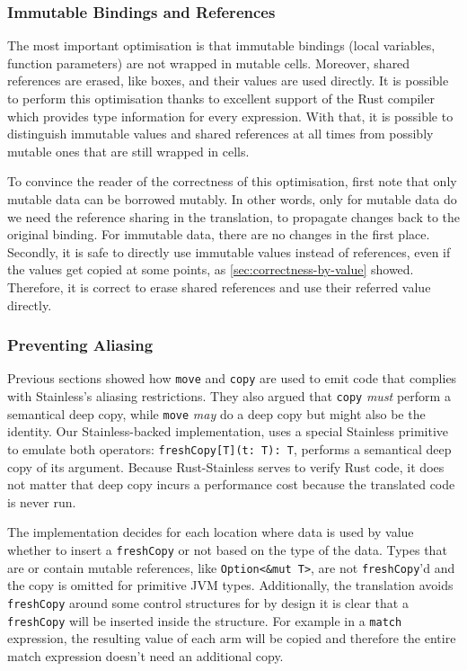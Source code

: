 \subsubsection{Immutable Bindings and References}

The most important optimisation is that immutable bindings (local variables,
function parameters) are not wrapped in mutable cells. Moreover, shared
references are erased, like boxes, and their values  are used directly. It is
possible to perform this optimisation thanks to excellent support of the Rust
compiler which provides type information for every expression. With that, it is
possible to distinguish immutable values and shared references at all times from
possibly mutable ones that are still wrapped in cells.

To convince the reader of the correctness of this optimisation, first note that
only mutable data can be borrowed mutably. In other words, only for mutable data
do we need the reference sharing in the translation, to propagate changes back
to the original binding. For immutable data, there are no changes in the first
place. Secondly, it is safe to directly use immutable values instead of
references, even if the values get copied at some points, as
\autoref{sec:correctness-by-value} showed. Therefore, it is correct to erase
shared references and use their referred value directly.

\subsubsection{Preventing Aliasing}

Previous sections showed how \lstinline!move! and \lstinline!copy! are used to
emit code that complies with Stainless's aliasing restrictions. They also argued
that \lstinline!copy! \emph{must} perform a semantical deep copy, while
\lstinline!move! \emph{may} do a deep copy but might also be the identity. Our
Stainless-backed implementation, uses a special Stainless primitive to emulate
both operators: \lstinline!freshCopy[T](t: T): T!, performs a semantical deep
copy of its argument. Because Rust-Stainless serves to verify Rust code, it does
not matter that deep copy incurs a performance cost because the translated code
is never run.

The implementation decides for each location where data is used by value whether
to insert a \lstinline!freshCopy! or not based on the type of the data. Types
that are or contain mutable references, like \lstinline!Option<&mut T>!, are not
\lstinline!freshCopy!'d and the copy is omitted for primitive JVM types.
Additionally, the translation avoids \lstinline!freshCopy! around some control
structures for by design it is clear that a \lstinline!freshCopy! will be
inserted inside the structure. For example in a \lstinline!match! expression,
the resulting value of each arm will be copied and therefore the entire match
expression doesn't need an additional copy.

